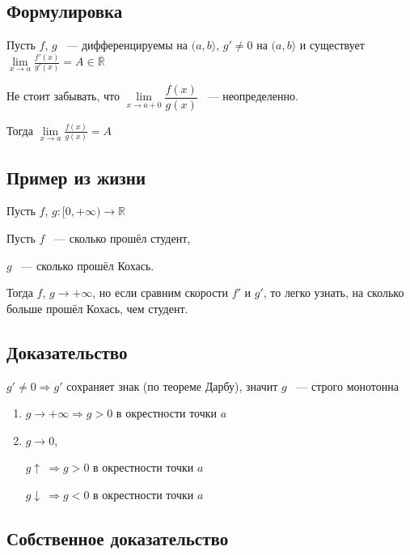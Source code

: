 \documentclass{article}
\begin{document}
		\subsection{Формулировка}
			
			Пусть $f$, $g$ ~--- дифференцируемы на $(a, b \rangle$, $g' \neq 0$ на $(a, b \rangle$ и существует $\lim\limits_{x \rightarrow a} \frac{f'(x)}{g'(x)} = A \in \overline{\mathbb{R}}$
			
			Не стоит забывать, что $\lim\limits_{x \rightarrow a + 0} \dfrac{f(x)}{g(x)}$ ~--- неопределенно.
			
			Тогда $\lim\limits_{x \rightarrow a} \frac{f(x)}{g(x)} = A$
			
		\subsection{Пример из жизни}
		
			Пусть $f$, $g : [0, +\infty) \rightarrow \mathbb{R}$
			
			Пусть $f$ ~--- сколько прошёл студент, 	
			
				$g$ ~--- сколько прошёл Кохась.
				
			Тогда $f$, $g \rightarrow +\infty$, но если сравним скорости $f'$ и $g'$, то легко узнать, на сколько больше прошёл Кохась, чем студент.
			
		\subsection{Доказательство}
		
			$g' \neq 0 \Rightarrow g'$ сохраняет знак (по теореме Дарбу), значит $g$ ~--- строго монотонна
			
			\begin{enumerate}
			
				\item $g \rightarrow +\infty \Rightarrow g > 0$ в окрестности точки $a$
				
				\item $g \rightarrow 0$,
					
					$g \uparrow \ \Rightarrow g > 0$ в окрестности точки $a$
			
					$g \downarrow \ \Rightarrow g < 0$ в окрестности точки $a$
					
			\end{enumerate}
			
		\subsection{Собственное доказательство}
		
\end{document}
